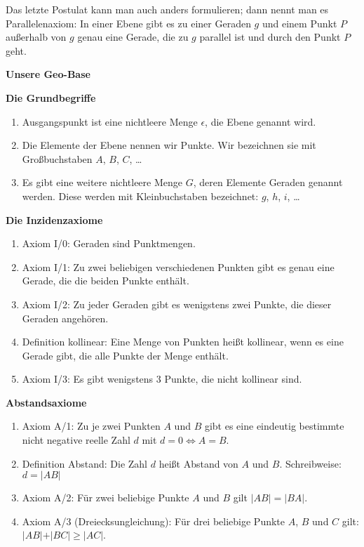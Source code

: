 \documentclass[12pt,a4paper,oneside,ngerman]{article}
\begin{document}
Das letzte Postulat kann man auch anders formulieren; dann nennt man es Parallelenaxiom: In einer Ebene gibt es zu einer Geraden $g$ und einem Punkt $P$ außerhalb von $g$ genau eine Gerade, die zu $g$ parallel ist und durch den Punkt $P$ geht.

\newpage
\begin{center}
{\LARGE\textbf{Unsere Geo-Base}}
\end{center}

\textbf{Die Grundbegriffe}
\begin{enumerate}
\item Ausgangspunkt ist eine nichtleere Menge $\epsilon$, die Ebene genannt wird.
\item Die Elemente der Ebene nennen wir Punkte. Wir bezeichnen sie mit Großbuchstaben $A$, $B$, $C$, \ldots
\item Es gibt eine weitere nichtleere Menge $G$, deren Elemente Geraden genannt werden. Diese werden mit Kleinbuchstaben bezeichnet: $g$, $h$, $i$, \ldots
\end{enumerate}

\textbf{Die Inzidenzaxiome}
\begin{enumerate}
\item Axiom I/0: Geraden sind Punktmengen.
\item Axiom I/1: Zu zwei beliebigen verschiedenen Punkten gibt es genau eine Gerade, die die beiden Punkte enthält.
\item Axiom I/2: Zu jeder Geraden gibt es wenigstens zwei Punkte, die dieser Geraden angehören.
\item Definition kollinear: Eine Menge von Punkten heißt kollinear, wenn es eine Gerade gibt, die alle Punkte der Menge enthält.
\item Axiom I/3: Es gibt wenigstens 3 Punkte, die nicht kollinear sind.
\end{enumerate}

\textbf{Abstandsaxiome}
\begin{enumerate}
\item Axiom A/1: Zu je zwei Punkten $A$ und $B$ gibt es eine eindeutig bestimmte nicht negative reelle Zahl $d$ mit $d=0 \Leftrightarrow A=B$. 
\item Definition Abstand: Die Zahl $d$ heißt Abstand von $A$ und $B$. Schreibweise: $d=|AB|$
\item Axiom A/2: Für zwei beliebige Punkte $A$ und $B$ gilt  $\vert AB\vert = \vert BA\vert$.
\item Axiom A/3 (Dreiecksungleichung): Für drei beliebige Punkte $A$, $B$ und $C$ gilt: $\vert AB\vert   + \vert BC \vert \geq \vert AC \vert$.
\end{enumerate}
\end{document}
